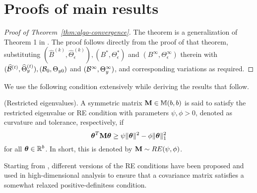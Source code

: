 \section{Proofs of main results}

\begin{proof}[Proof of Theorem~\ref{thm:algo-convergence}]
The theorem is a generalization of Theorem 1 in \cite{LinEtal16}. The proof follows directly from the proof of that theorem, substituting $( \widehat B^{(k)}, \widehat \Theta_\epsilon^{(k)}), (B^*, \Theta_\epsilon^*)$ and $ (B^\infty, \Theta_\epsilon^\infty)$ therein with $(\widehat {{\cal{B}}}^{(t)}, \widehat \Theta_y^{(t)}), ( {\cal{B}}_0, \Theta_{y 0})$ and $ ({\cal{B}}^\infty, \Theta_y^\infty)$, and corresponding variations as required.

\end{proof}

We use the following condition extensively while deriving the results that follow.

\vspace{1em}
 (Restricted eigenvalues). A symmetric matrix ${\mathbf{M}} \in {\mathbb{M}}(b,b)$ is said to satisfy the restricted eigenvalue or RE condition with parameters $\psi, \phi >0$, denoted as curvature and tolerance, respectively, if
%
$$
{\boldsymbol{\theta}}^T {\mathbf{M}} {\boldsymbol{\theta}} \geq \psi \| {\boldsymbol{\theta}} \|^2 - \phi \| {\boldsymbol{\theta}} \|_1^2
$$
%
for all ${\boldsymbol{\theta}} \in {\mathbb{R}}^b$. In short, this is denoted by ${\mathbf{M}} \sim RE(\psi, \phi)$.

Starting from \cite{BickelRitovTsybakov09}, different versions of the RE conditions have been proposed and used in high-dimensional analysis \citep{LohWainwright12,BasuMichailidis15,MaMichailidis15,vandeGeerBuhlmann09} to ensure that a covariance matrix satisfies a somewhat relaxed positive-definitess condition.

